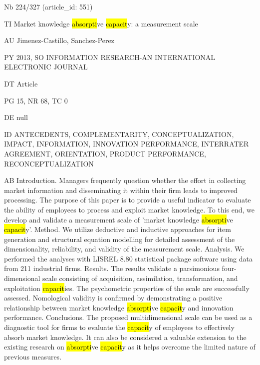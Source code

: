 \documentclass[a4paper]{article}
\begin{document}
\vspace*{-2cm}
Nb \tabto{0cm}224/327 (article\_id: 551)\par
TI \tabto{0cm}Market knowledge \hl{absorpti}ve \hl{capacit}y: a measurement scale\par
AU \tabto{0cm}Jimenez-Castillo, Sanchez-Perez\par
PY \tabto{0cm}2013, SO INFORMATION RESEARCH-AN INTERNATIONAL ELECTRONIC JOURNAL\par
DT \tabto{0cm}Article\par
PG \tabto{0cm}15, NR 68, TC 0\par
DE \tabto{0cm}null\par
ID \tabto{0cm}ANTECEDENTS, COMPLEMENTARITY, CONCEPTUALIZATION, IMPACT, INFORMATION, INNOVATION PERFORMANCE, INTERRATER AGREEMENT, ORIENTATION, PRODUCT PERFORMANCE, RECONCEPTUALIZATION\par
AB \tabto{0cm}Introduction. Managers frequently question whether the effort in collecting market information and disseminating it within their firm leads to improved processing. The purpose of this paper is to provide a useful indicator to evaluate the ability of employees to process and exploit market knowledge. To this end, we develop and validate a measurement scale of 'market knowledge \hl{absorpti}ve \hl{capacit}y'.
Method. We utilize deductive and inductive approaches for item generation and structural equation modelling for detailed assessment of the dimensionality, reliability, and validity of the measurement scale.
Analysis. We performed the analyses with LISREL 8.80 statistical package software using data from 211 industrial firms.
Results. The results validate a parsimonious four-dimensional scale consisting of acquisition, assimilation, transformation, and exploitation \hl{capacit}ies. The psychometric properties of the scale are successfully assessed. Nomological validity is confirmed by demonstrating a positive relationship between market knowledge \hl{absorpti}ve \hl{capacit}y and innovation performance.
Conclusions. The proposed multidimensional scale can be used as a diagnostic tool for firms to evaluate the \hl{capacit}y of employees to effectively absorb market knowledge. It can also be considered a valuable extension to the existing research on \hl{absorpti}ve \hl{capacit}y as it helps overcome the limited nature of previous measures.\par
\clearpage
\end{document}
